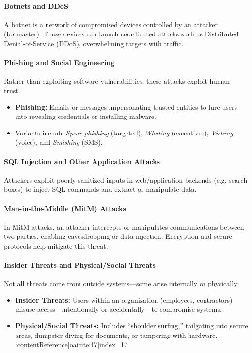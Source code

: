 \documentclass[12pt,a4paper]{report}
\begin{document}
\paragraph{Botnets and DDoS}
A botnet is a network of compromised devices controlled by an attacker (botmaster). Those devices can launch coordinated attacks such as Distributed Denial-of-Service (DDoS), overwhelming targets with traffic. 

\paragraph{Phishing and Social Engineering}
Rather than exploiting software vulnerabilities, these attacks exploit human trust. 
\begin{itemize}
  \item \textbf{Phishing:} Emails or messages impersonating trusted entities to lure users into revealing credentials or installing malware.
  \item Variants include \textit{Spear phishing} (targeted), \textit{Whaling} (executives), \textit{Vishing} (voice), and \textit{Smishing} (SMS). 
\end{itemize}

\paragraph{SQL Injection and Other Application Attacks}
Attackers exploit poorly sanitized inputs in web/application backends (e.g. search boxes) to inject SQL commands and extract or manipulate data.

\paragraph{Man-in-the-Middle (MitM) Attacks}
In MitM attacks, an attacker intercepts or manipulates communications between two parties, enabling eavesdropping or data injection. Encryption and secure protocols help mitigate this threat. 

\paragraph{Insider Threats and Physical/Social Threats}
Not all threats come from outside systems—some arise internally or physically:
\begin{itemize}
  \item \textbf{Insider Threats:} Users within an organization (employees, contractors) misuse access—intentionally or accidentally—to compromise systems.  
  \item \textbf{Physical/Social Threats:} Includes “shoulder surfing,” tailgating into secure areas, dumpster diving for documents, or tampering with hardware. :contentReference[oaicite:17]{index=17}  
\end{itemize}
\end{document}
